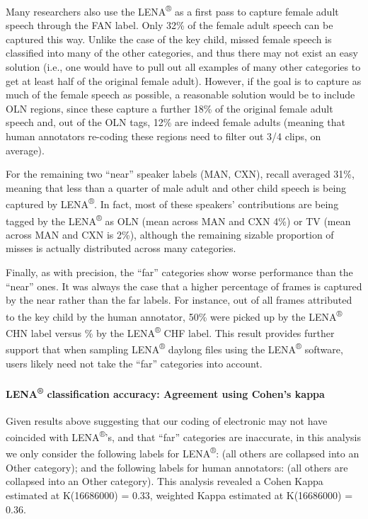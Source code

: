 \documentclass[english,table,man,floatsintext]{apa6}
\let\oldparagraph\paragraph
\renewcommand{\paragraph}[1]{\oldparagraph{#1}\mbox{}}
\begin{document}
Many researchers also use the LENA\textsuperscript{®} as a first pass to capture female adult speech through the FAN label. Only 32\% of the female adult speech can be captured this way. Unlike the case of the key child, missed female speech is classified into many of the other categories, and thus there may not exist an easy solution (i.e., one would have to pull out all examples of many other categories to get at least half of the original female adult). However, if the goal is to capture as much of the female speech as possible, a reasonable solution would be to include OLN regions, since these capture a further 18\% of the original female adult speech and, out of the OLN tags, 12\% are indeed female adults (meaning that human annotators re-coding these regions need to filter out 3/4 clips, on average).

For the remaining two \enquote{near} speaker labels (MAN, CXN), recall averaged 31\%, meaning that less than a quarter of male adult and other child speech is being captured by LENA\textsuperscript{®}. In fact, most of these speakers' contributions are being tagged by the LENA\textsuperscript{®} as OLN (mean across MAN and CXN 4\%) or TV (mean across MAN and CXN is 2\%), although the remaining sizable proportion of misses is actually distributed across many categories.

Finally, as with precision, the \enquote{far} categories show worse performance than the \enquote{near} ones. It was always the case that a higher percentage of frames is captured by the near rather than the far labels. For instance, out of all frames attributed to the key child by the human annotator, 50\% were picked up by the LENA\textsuperscript{®} CHN label versus \% by the LENA\textsuperscript{®} CHF label. This result provides further support that when sampling LENA\textsuperscript{®} daylong files using the LENA\textsuperscript{®} software, users likely need not take the \enquote{far} categories into account.

\hypertarget{lena-classification-accuracy-agreement-using-cohens-kappa}{%
\paragraph{\texorpdfstring{LENA\textsuperscript{®} classification accuracy: Agreement using Cohen's kappa}{LENA® classification accuracy: Agreement using Cohen's kappa}}\label{lena-classification-accuracy-agreement-using-cohens-kappa}}

Given results above suggesting that our coding of electronic may not have coincided with LENA\textsuperscript{®}'s, and that \enquote{far} categories are inaccurate, in this analysis we only consider the following labels for LENA\textsuperscript{®}: (all others are collapsed into an Other category); and the following labels for human annotators: (all others are collapsed into an Other category). This analysis revealed a Cohen Kappa estimated at K(16686000) = 0.33, weighted Kappa estimated at K(16686000) = 0.36.
\end{document}
